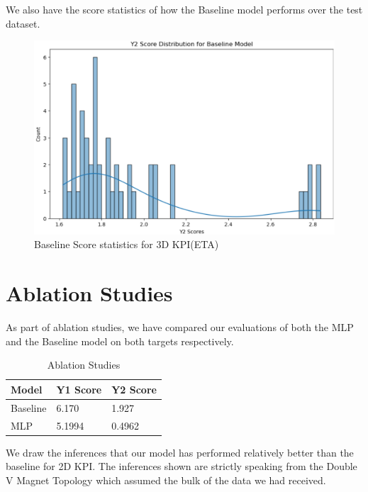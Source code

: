 \documentclass{report} %
\begin{document}
We also have the score statistics of how the Baseline model performs over the test dataset.\\

\begin{figure}[H]
    \centering
    \includegraphics[width=1\textwidth]{./ReportImages/score_baseline_y2.png} 
    \caption{Baseline Score statistics for 3D KPI(ETA)} 
    \label{fig:Baseline Score statistics for 3D KPI(ETA)}
\end{figure}


\section{Ablation Studies}\label{sec:Ablation Studies}

As part of ablation studies, we have compared our evaluations of both the \ac{MLP} and the Baseline model on both targets respectively.

\begin{table}[H]
    \centering
    \begin{tabularx}{1\linewidth}{|X|X|X|}
    \hline {\bf Model} & {\bf Y1 Score} & {\bf Y2 Score}\\
    \hline 
    Baseline & 6.170 & 1.927 \\
    MLP & 5.1994 & 0.4962 \\
    \hline
    \end{tabularx}
    \caption{Ablation Studies}
    \label{tab:Ablation Studies}
\end{table}

We draw the inferences that our model has performed relatively better than the baseline for 2D KPI.
The inferences shown are strictly speaking from the Double V Magnet Topology which assumed the bulk of the data we had received.
\newpage 
\end{document}
